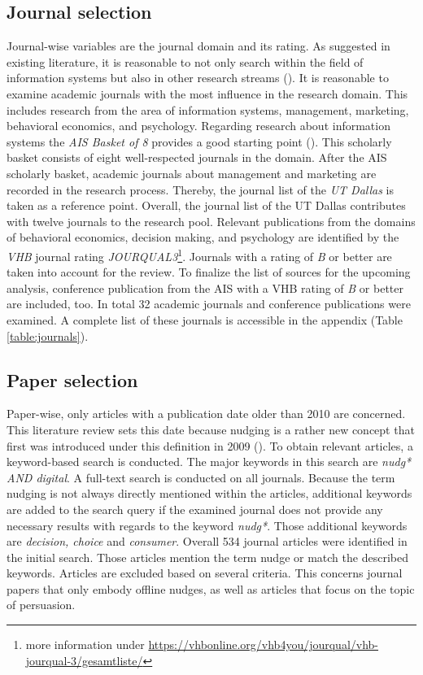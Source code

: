 \subsection{Journal selection}
Journal-wise variables are the journal domain and its rating. As suggested in existing literature, it is reasonable to not only search within the field of information systems but also in other research streams (\cite{webster_analyzing_2002}). It is reasonable to examine academic journals with the most influence in the research domain. This includes research from the area of information systems, management, marketing, behavioral economics, and psychology. Regarding research about information systems the \textit{AIS Basket of 8} provides a good starting point (\cite{alavi_review_1992}). This scholarly basket consists of eight well-respected journals in the domain. After the AIS scholarly basket, academic journals about management and marketing are recorded in the research process. Thereby, the journal list of the \textit{UT Dallas} is taken as a reference point. Overall, the journal list of the UT Dallas contributes with twelve journals to the research pool. 
Relevant publications from the domains of behavioral economics, decision making, and psychology are identified by the \textit{VHB} journal rating \textit{JOURQUAL3}\footnote{more information under \url{https://vhbonline.org/vhb4you/jourqual/vhb-jourqual-3/gesamtliste/}}. Journals with a rating of \textit{B} or better are taken into account for the review.
To finalize the list of sources for the upcoming analysis, conference publication from the AIS with a VHB rating of \textit{B} or better are included, too. In total 32 academic journals and conference publications were examined. A complete list of these journals is accessible in the appendix (Table \ref{table:journals}).

\subsection{Paper selection}
Paper-wise, only articles with a publication date older than 2010 are concerned. This literature review sets this date because nudging is a rather new concept that first was introduced under this definition in 2009 (\cite{thaler_nudge:_2009}). To obtain relevant articles, a keyword-based search is conducted. The major keywords in this search are \textit{nudg* AND digital}. A full-text search is conducted on all journals. Because the term nudging is not always directly mentioned within the articles, additional keywords are added to the search query if the examined journal does not provide any necessary results with regards to the keyword \textit{nudg*}. Those additional keywords are \textit{decision, choice} and \textit{consumer}. Overall 534 journal articles were identified in the initial search. Those articles mention the term nudge or match the described keywords. Articles are excluded based on several criteria. This concerns journal papers that only embody offline nudges, as well as articles that focus on the topic of persuasion. 
\\

